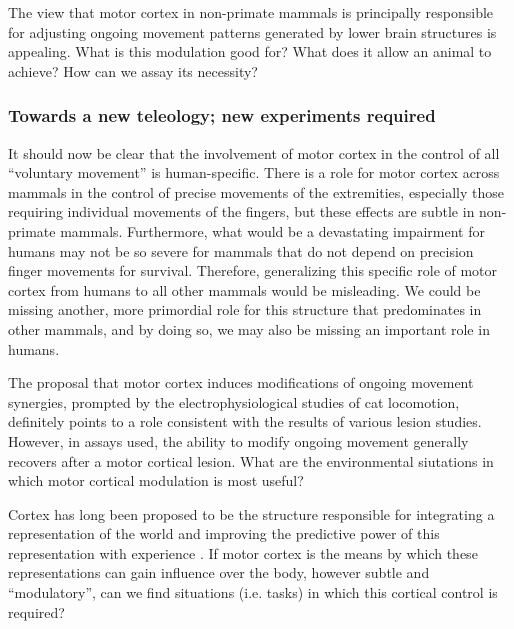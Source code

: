 The view that motor cortex in non-primate mammals is principally responsible for adjusting ongoing movement patterns generated by lower brain structures is appealing. What is this modulation good for? What does it allow an animal to achieve? How can we assay its necessity?

\subsubsection*{Towards a new teleology; new experiments required}

It should now be clear that the involvement of motor cortex in the control of all ``voluntary movement'' is human-specific. There is a role for motor cortex across mammals in the control of precise movements of the extremities, especially those requiring individual movements of the fingers, but these effects are subtle in non-primate mammals. Furthermore, what would be a devastating impairment for humans may not be so severe for mammals that do not depend on precision finger movements for survival. Therefore, generalizing this specific role of motor cortex from humans to all other mammals would be misleading. We could be missing another, more primordial role for this structure that predominates in other mammals, and by doing so, we may also be missing an important role in humans.

The proposal that motor cortex induces modifications of ongoing movement synergies, prompted by the electrophysiological studies of cat locomotion, definitely points to a role consistent with the results of various lesion studies. However, in assays used, the ability to modify ongoing movement generally recovers after a motor cortical lesion. What are the environmental siutations in which motor cortical modulation is most useful?

Cortex has long been proposed to be the structure responsible for integrating a representation of the world and improving the predictive power of this representation with experience \cite{Barlow1985,Doya1999}. If motor cortex is the means by which these representations can gain influence over the body, however subtle and ``modulatory'', can we find situations (i.e. tasks) in which this cortical control is required?

